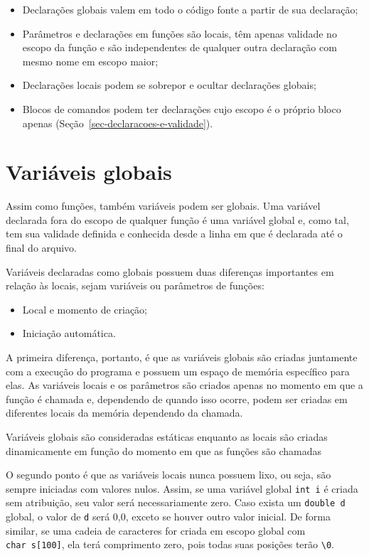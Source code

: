 \documentclass[
  11pt,
  a4paper,
]{scrbook}
\providecommand{\tightlist}{%
  \setlength{\itemsep}{0pt}\setlength{\parskip}{0pt}}\usepackage{longtable,booktabs,array}
\begin{document}
\begin{itemize}
\tightlist
\item
  Declarações globais valem em todo o código fonte a partir de sua
  declaração;
\item
  Parâmetros e declarações em funções são locais, têm apenas validade no
  escopo da função e são independentes de qualquer outra declaração com
  mesmo nome em escopo maior;
\item
  Declarações locais podem se sobrepor e ocultar declarações globais;
\item
  Blocos de comandos podem ter declarações cujo escopo é o próprio bloco
  apenas (Seção~\ref{sec-declaracoes-e-validade}).
\end{itemize}

\section{Variáveis globais}\label{variuxe1veis-globais}

Assim como funções, também variáveis podem ser globais. Uma variável
declarada fora do escopo de qualquer função é uma variável global e,
como tal, tem sua validade definida e conhecida desde a linha em que é
declarada até o final do arquivo.

Variáveis declaradas como globais possuem duas diferenças importantes em
relação às locais, sejam variáveis ou parâmetros de funções:

\begin{itemize}
\tightlist
\item
  Local e momento de criação;
\item
  Iniciação automática.
\end{itemize}

A primeira diferença, portanto, é que as variáveis globais são criadas
juntamente com a execução do programa e possuem um espaço de memória
específico para elas. As variáveis locais e os parâmetros são criados
apenas no momento em que a função é chamada e, dependendo de quando isso
ocorre, podem ser criadas em diferentes locais da memória dependendo da
chamada.

Variáveis globais são consideradas estáticas enquanto as locais são
criadas dinamicamente em função do momento em que as funções são
chamadas

O segundo ponto é que as variáveis locais nunca possuem lixo, ou seja,
são sempre iniciadas com valores nulos. Assim, se uma variável global
\texttt{int\ i} é criada sem atribuição, seu valor será necessariamente
zero. Caso exista um \texttt{double\ d} global, o valor de \texttt{d}
será 0,0, exceto se houver outro valor inicial. De forma similar, se uma
cadeia de caracteres for criada em escopo global com
\texttt{char\ s{[}100{]}}, ela terá comprimento zero, pois todas suas
posições terão \texttt{\textbackslash{}0}.
\end{document}
